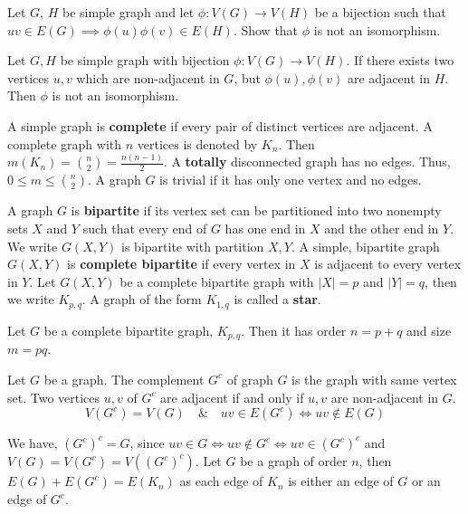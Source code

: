 \begin{exercise}
	Let $G$, $H$ be simple graph and let $\phi : V(G) \to V(H)$ be a bijection such that $uv \in E(G) \implies \phi(u)\phi(v) \in E(H)$. Show that $\phi$ is not an isomorphism.
\end{exercise}
	Let $G,H$ be simple graph with bijection $\phi : V(G) \to V(H)$.
	If there exists two vertices $u,v$ which are non-adjacent in $G$, but $\phi(u),\phi(v)$ are adjacent in $H$.
	Then $\phi$ is not an isomorphism.

\begin{definition}
	A simple graph is \textbf{complete} if every pair of distinct vertices are adjacent.
	A complete graph with $n$ vertices is denoted by $K_n$.
	Then $m(K_n) = \binom{n}{2} = \frac{n(n-1)}{2}$.
	A \textbf{totally} disconnected graph has no edges.
	Thus, $0 \le m \le \binom{n}{2}$.
	A graph $G$ is trivial if it has only one vertex and no edges.
\end{definition}

\begin{definition}
	A graph $G$ is \textbf{bipartite} if its vertex set can be partitioned into two nonempty sets $X$ and $Y$ such that every end of $G$ has one end in $X$ and the other end in $Y$. We write $G(X,Y)$ is bipartite with partition $X,Y$.
	A simple, bipartite graph $G(X,Y)$ is \textbf{complete bipartite} if every vertex in $X$ is adjacent to every vertex in $Y$. Let $G(X,Y)$ be a complete bipartite graph with $|X| = p$ and $|Y|=q$, then we write $K_{p,q}$. A graph of the form $K_{1,q}$ is called a \textbf{star}.
\end{definition}

\begin{remark}
	Let $G$ be a complete bipartite graph, $K_{p,q}$.
	Then it has order $n = p+q$ and size $m = pq$.
\end{remark}

\begin{definition}
Let $G$ be a graph. The complement $G^c$ of graph $G$ is the graph with same vertex set. Two vertices $u,v$ of $G^c$ are adjacent if and only if $u,v$ are non-adjacent in $G$.
	$$ V(G^c) = V(G) \quad \& \quad uv \in E(G^c) \iff uv \notin E(G) $$
\end{definition}
\begin{remark}
	We have, $(G^c)^c = G$, since ${uv \in G \iff uv \notin G^c \iff uv \in (G^c)^c}$ and $V(G) = V(G^c) = V((G^c)^c)$.
	Let $G$ be a graph of order $n$, then $E(G) + E(G^c) = E(K_n)$ as each edge of $K_n$ is either an edge of $G$ or an edge of $G^c$.
\end{remark}

